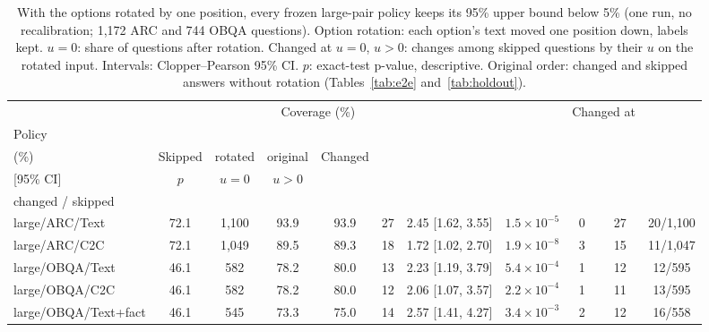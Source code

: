 \begin{table}[!htbp]\centering\scriptsize
\caption{With the options rotated by one position, every frozen large-pair policy keeps its 95\% upper bound below 5\% (one run, no recalibration; 1,172 ARC and 744 OBQA questions). Option rotation: each option's text moved one position down, labels kept. $u=0$: share of questions after rotation. Changed at $u=0$, $u>0$: changes among skipped questions by their $u$ on the rotated input. Intervals: Clopper--Pearson 95\% CI. $p$: exact-test p-value, descriptive. Original order: changed and skipped answers without rotation (Tables~\ref{tab:e2e} and~\ref{tab:holdout}).}
\label{tab:rotation}
\renewcommand{\arraystretch}{1.1}\setlength{\tabcolsep}{2.5pt}
\begin{tabular*}{\linewidth}{@{}l@{\hspace{5pt}\extracolsep{\fill}}cccccccccc@{}}\toprule
& & & \multicolumn{2}{c}{Coverage (\%)} & & & & \multicolumn{2}{c}{Changed at} & \\\cmidrule(lr){4-5}\cmidrule(lr){9-10}
Policy & \begin{tabular}[b]{@{}c@{}}$u=0$\\(\%)\end{tabular} & Skipped & rotated & original & Changed & \begin{tabular}[b]{@{}c@{}}Change rate (\%)\\{}[95\% CI]\end{tabular} & $p$ & $u=0$ & $u>0$ & \begin{tabular}[b]{@{}c@{}}Original order:\\changed / skipped\end{tabular}\\\midrule
large/ARC/Text & 72.1 & 1,100 & 93.9 & 93.9 & 27 & 2.45 [1.62, 3.55] & $1.5\times10^{-5}$ & 0 & 27 & 20/1,100\\
large/ARC/C2C & 72.1 & 1,049 & 89.5 & 89.3 & 18 & 1.72 [1.02, 2.70] & $1.9\times10^{-8}$ & 3 & 15 & 11/1,047\\
large/OBQA/Text & 46.1 & 582 & 78.2 & 80.0 & 13 & 2.23 [1.19, 3.79] & $5.4\times10^{-4}$ & 1 & 12 & 12/595\\
large/OBQA/C2C & 46.1 & 582 & 78.2 & 80.0 & 12 & 2.06 [1.07, 3.57] & $2.2\times10^{-4}$ & 1 & 11 & 13/595\\
large/OBQA/Text+fact & 46.1 & 545 & 73.3 & 75.0 & 14 & 2.57 [1.41, 4.27] & $3.4\times10^{-3}$ & 2 & 12 & 16/558\\\bottomrule
\end{tabular*}
\end{table}

